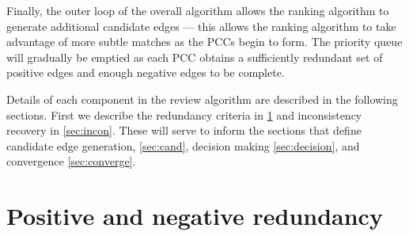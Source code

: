 Finally, the outer loop of the overall algorithm allows the ranking algorithm to generate additional candidate
edges --- this allows the ranking algorithm to take advantage of more subtle matches as the PCCs begin to form. The
priority queue will gradually be emptied as each PCC obtains a sufficiently redundant set of positive edges and
enough negative edges to be complete.

Details of each component in the review algorithm are described in the following sections.  First we describe the
redundancy criteria in \cref{sec:redun} and inconsistency recovery in \cref{sec:incon}. These will serve to inform
the sections that define candidate edge generation, \cref{sec:cand}, decision making \cref{sec:decision},  and
convergence \cref{sec:converge}.


\section{Positive and negative redundancy}\label{sec:redun}

